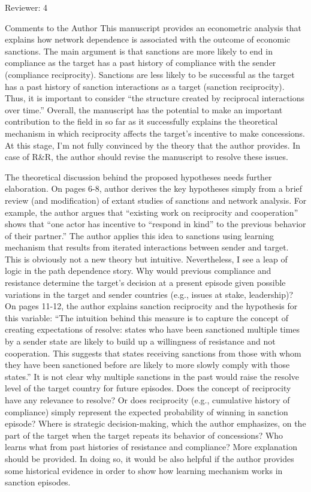 Reviewer: 4

Comments to the Author
This manuscript provides an econometric analysis that explains how network dependence is associated with the outcome of economic sanctions. The main argument is that sanctions are more likely to end in compliance as the target has a past history of compliance with the sender (compliance reciprocity). Sanctions are less likely to be successful as the target has a past history of sanction interactions as a target (sanction reciprocity). Thus, it is important to consider “the structure created by reciprocal interactions over time.” Overall, the manuscript has the potential to make an important contribution to the field in so far as it successfully explains the theoretical mechanism in which reciprocity affects the target’s incentive to make concessions. At this stage, I’m not fully convinced by the theory that the author provides. In case of R&R, the author should revise the manuscript to resolve these issues.

The theoretical discussion behind the proposed hypotheses needs further elaboration. On pages 6-8, author derives the key hypotheses simply from a brief review (and modification) of extant studies of sanctions and network analysis. For example, the author argues that “existing work on reciprocity and cooperation” shows that “one actor has incentive to “respond in kind” to the previous behavior of their partner.” The author applies this idea to sanctions using learning mechanism that results from iterated interactions between sender and target. This is obviously not a new theory but intuitive. Nevertheless, I see a leap of logic in the path dependence story. Why would previous compliance and resistance determine the target’s decision at a present episode given possible variations in the target and sender countries (e.g., issues at stake, leadership)? On pages 11-12, the author explains sanction reciprocity and the hypothesis for this variable: “The intuition behind this measure is to capture the concept of creating expectations of resolve: states who have been sanctioned multiple times by a sender state are likely to build up a willingness of resistance and not cooperation. This suggests that states receiving sanctions from those with whom they have been sanctioned before are likely to more slowly comply with those states.” It is not clear why multiple sanctions in the past would raise the resolve level of the target country for future episodes. Does the concept of reciprocity have any relevance to resolve? Or does reciprocity (e.g., cumulative history of compliance) simply represent the expected probability of winning in sanction episode? Where is strategic decision-making, which the author emphasizes, on the part of the target when the target repeats its behavior of concessions? Who learns what from past histories of resistance and compliance? More explanation should be provided. In doing so, it would be also helpful if the author provides some historical evidence in order to show how learning mechanism works in sanction episodes.